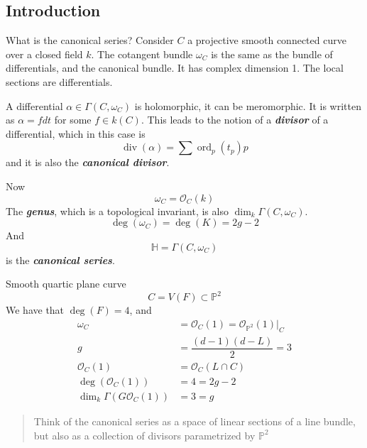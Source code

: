 \subsection{Introduction}

What is the canonical series? Consider $C$ a projective smooth connected curve over a closed field $k$. The cotangent bundle  $\omega_C$ is the same as the bundle of differentials, and the canonical bundle. It has complex dimension 1. The local sections are differentials.

A differential $\alpha \in\Gamma(C,\omega_C)$ is holomorphic, it can be meromorphic. It is written as $\alpha=fdt$ for some $f\in k(C)$. This leads to the notion of a \textit{\textbf{divisor}} of a differential, which in this case is
 \[\operatorname{div}(\alpha)=\sum \operatorname{ord}_p(t_p)p\]
 and it is also the \textit{\textbf{canonical divisor}}. 

 Now
 \[\omega_C=\mathcal{O}_C(k)\]
 The \textit{\textbf{genus}}, which is a topological invariant, is also  $\dim_k\Gamma(C,\omega_C)$.
 \[\operatorname{deg}(\omega_C)=\operatorname{deg}(K)=2g-2\]
 And
 \[\mathbb{H}=\Gamma(C,\omega_C)\]
 is the \textit{\textbf{canonical series}}.

  \begin{example}
 	Smooth quartic plane curve
	\[C=V(F)\subset \mathbb{P}^2\]
	We have that $\operatorname{deg}(F)=4$, and
	\begin{align*}
		\omega_C&=\mathcal{O}_C(1)=\mathcal{O}_{\mathbb{P}^2}(1)|_{C}\\
		g&=\dfrac{(d-1)(d-L)}{2}=3\\
		\mathcal{O}_C(1)&=\mathcal{O}_C(L\cap C)\\
		\operatorname{deg}(\mathcal{O}_C(1))&=4=2g-2\\
		\dim_k\Gamma(G\mathcal{O}_C(1))&=3=g
	\end{align*}
 \end{example}
\begin{quotation}
	Think of the canonical series as a space of linear sections of a line bundle, but also as a collection of divisors parametrized by $\mathbb{P}^2$
\end{quotation}

\begin{example}
\end{example}

